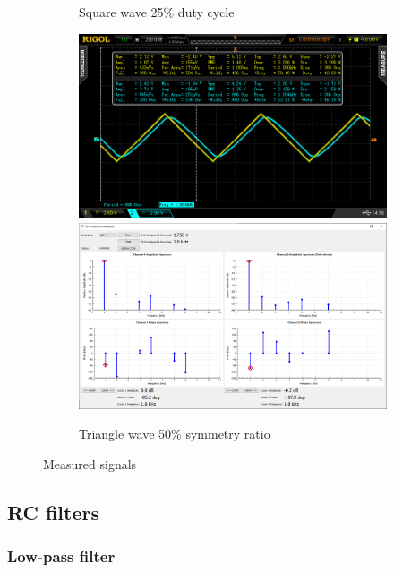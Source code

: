 \documentclass[notitlepage, a4paper, 11pt]{article}
\begin{document}
\begin{figure}[H]
\begin{subfigure}[][][t]{0.23\textwidth}
			\caption{Square wave 25\% duty cycle}
		\end{subfigure}
		\hfill
		\begin{subfigure}[][][t]{0.23\textwidth}
			\includegraphics[width=\textwidth, trim=85 50 112 45, clip]{../img/osc/DS2_QuickPrint2.png}
			\includegraphics[width=\textwidth, trim=10 80 555 100, clip]{../img/Circuit1/trig50}
			\caption{Triangle wave 50\% symmetry ratio}
		\end{subfigure}
		\caption{Measured signals}
		\label{fig:pure-signals}
	\end{figure}
	
	\subsection{RC filters}
	
	\subsubsection{Low-pass filter}
\end{document}
